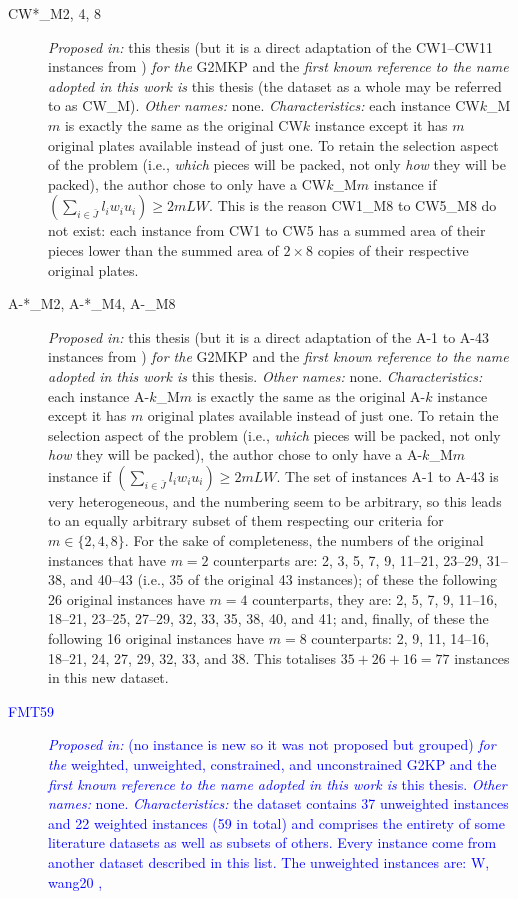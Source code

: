 \documentclass[ppgc,tese,english,formais,babel]{iiufrgs}
\newif\iffinalversion
\newcommand{\newtext}[1]{\iffinalversion%
#1%
\else%
\textcolor{blue}{#1}%
\fi%
}
\begin{document}
\begin{description}
\item [CW*\_M{2, 4, 8}] \emph{Proposed in:} this thesis (but it is a direct adaptation of the CW1--CW11 instances from \citet{fayard:1998}) \emph{for the} G2MKP and the \emph{first known reference to the name adopted in this work is} this thesis (the dataset as a whole may be referred to as CW\_M). \emph{Other names:} none. \emph{Characteristics:} each instance CW\(k\)\_M\(m\) is exactly the same as the original CW\(k\) instance except it has \(m\) original plates available instead of just one. To retain the selection aspect of the problem (i.e., \emph{which} pieces will be packed, not only \emph{how} they will be packed), the author chose to only have a CW\(k\)\_M\(m\) instance if \((\sum_{i \in \bar{J}} l_i w_i u_i) \geq 2 m L W\). This is the reason CW1\_M8 to CW5\_M8 do not exist: each instance from CW1 to CW5 has a summed area of their pieces lower than the summed area of \(2 \times 8\) copies of their respective original plates.
\item [A-*\_M2, A-*\_M4, A-\_M8] \emph{Proposed in:} this thesis (but it is a direct adaptation of the A-1 to A-43 instances from \citet{macedo:2010}) \emph{for the} G2MKP and the \emph{first known reference to the name adopted in this work is} this thesis. \emph{Other names:} none. \emph{Characteristics:} each instance A-\(k\)\_M\(m\) is exactly the same as the original A-\(k\) instance except it has \(m\) original plates available instead of just one. To retain the selection aspect of the problem (i.e., \emph{which} pieces will be packed, not only \emph{how} they will be packed), the author chose to only have a A-\(k\)\_M\(m\) instance if \((\sum_{i \in \bar{J}} l_i w_i u_i) \geq 2 m L W\). The set of instances A-1 to A-43 is very heterogeneous, and the numbering seem to be arbitrary, so this leads to an equally arbitrary subset of them respecting our criteria for \(m \in \{2, 4, 8\}\). For the sake of completeness, the numbers of the original instances that have \(m = 2\) counterparts are: 2, 3, 5, 7, 9, 11--21, 23--29, 31--38, and 40--43 (i.e., 35 of the original 43 instances); of these the following 26 original instances have \(m = 4\) counterparts, they are: 2, 5, 7, 9, 11--16, 18--21, 23--25, 27--29, 32, 33, 35, 38, 40, and 41; and, finally, of these the following 16 original instances have \(m = 8\) counterparts: 2, 9, 11, 14--16, 18--21, 24, 27, 29, 32, 33, and 38. This totalises \(35 + 26 + 16 = 77\) instances in this new dataset.
\item [\newtext{FMT59}] \newtext{\emph{Proposed in:} \citet{furini:2016} (no instance is new so it was not proposed but grouped) \emph{for the} weighted, unweighted, constrained, and unconstrained G2KP and the \emph{first known reference to the name adopted in this work is} this thesis. \emph{Other names:} none. \emph{Characteristics:} the dataset contains 37 unweighted instances and 22 weighted instances (59 in total) and comprises the entirety of some literature datasets as well as subsets of others. Every instance come from another dataset described in this list. The unweighted instances are: W, wang20 \citep{wang:1983},
}
\end{description}
\end{document}
